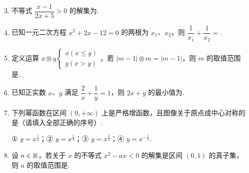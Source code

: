 \documentclass[a4paper,11pt]{article}
\begin{document}


\begin{enumerate}
\setcounter{enumi}{2}

\item 不等式 $\dfrac{x-1}{2x+5}>0$ 的解集为\blankline[4.4em].

\ifanswer
{}
\fi

\item 已知一元二次方程 $x^2+2x-12=0$ 的两根为 $x_1$、$x_2$，则 $\dfrac1{x_1}+\dfrac1{x_2}=$\blankline[4.4em].

\ifanswer
\solbegin
{}
\solend
\fi

\item 定义运算 $x\otimes y\begin{cases}x(x\leqslant y)\\y(x>y)\end{cases}$，若 $\lvert m-1\rvert\otimes m=\lvert m-1\rvert$，则 $m$ 的取值范围是\blankline[4.4em].

\ifanswer
\solbegin
{}
\solend
\fi

\item 已知正实数 $x$、$y$ 满足 $\dfrac2x+\dfrac1y=1$，则 $2x+y$ 的最小值为\blankline[4.4em].

\ifanswer
\solbegin
{}
\solend
\fi

\item 下列幂函数在区间 $(0,+\infty)$ 上是严格增函数，且图像关于原点成中心对称的是\blankline[4.4em]（请填入全部正确的序号）.

① $y=x^{\frac12}$；② $y=x^{\frac13}$；③ $y=x^{\frac23}$；④ $y=x^{-\frac13}$.

\ifanswer
{}
\fi

\item 设 $a\in\mathbb{R}$，若关于 $x$ 的不等式 $x^2-ax<0$ 的解集是区间 $(0,1)$ 的真子集，则 $a$ 的取值范围是\blankline[4.4em].


\end{enumerate}
\end{document}
